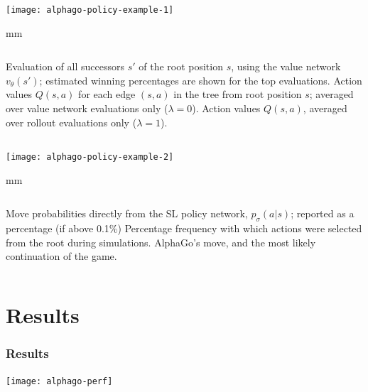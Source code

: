 \documentclass{beamer}
\begin{document}
\begin{frame}
  \begin{center}
    \texttt{[image: alphago-policy-example-1]}
  \end{center}
   mm
  \begin{columns}
    Evaluation of all successors $s′$ of the root position $s$, using the value network $v_\theta(s′)$; estimated winning percentages are shown for the top evaluations.
    Action values $Q(s, a)$ for each edge $(s, a)$ in the tree from root position $s$; averaged over value network evaluations only ($\lambda = 0$).
    Action values $Q(s, a)$, averaged over rollout evaluations only ($\lambda = 1$).
  \end{columns}
\end{frame}

\begin{frame}
  \begin{center}
    \texttt{[image: alphago-policy-example-2]}
  \end{center}
   mm
  \begin{columns}
    Move probabilities directly from the SL policy network, $p_\sigma(a|s)$; reported as a percentage (if above 0.1\%)
    Percentage frequency with which actions were selected from the root during simulations.
    AlphaGo's move, and the most likely continuation of the game.
  \end{columns}
\end{frame}


\section{Results}

\begin{frame}
  \frametitle{Results}
  \texttt{[image: alphago-perf]}
\end{frame}
\end{document}

